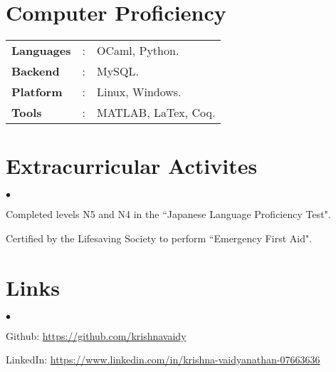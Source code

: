 \documentclass[margin,line]{res}
\newenvironment{list2}{
  \begin{list}{$\bullet$}{%
      \setlength{\itemsep}{0in}
      \setlength{\parsep}{0in} \setlength{\parskip}{0in}
      \setlength{\topsep}{0in} \setlength{\partopsep}{0in} 
      \setlength{\leftmargin}{0.2in}}}{\end{list}}
\begin{document}
\begin{resume}
\section{\sc Computer Proficiency}
\begin{tabular}{l l l}

\textbf{Languages}&: & OCaml, Python.\\
\textbf{Backend}&:	& MySQL.\\
\textbf{Platform}&:  & Linux, Windows.\\
\textbf{Tools}&:     &MATLAB, LaTex, Coq.\\
\end{tabular}

\section{\sc Extracurricular Activites}
\begin{list2}
\item Completed levels N5 and N4 in the ``Japanese Language Proficiency Test".
\item Certified by the Lifesaving Society to perform ``Emergency First Aid".
\end{list2}

\section{\sc Links}
\begin{list2}
\item Github: \url{https://github.com/krishnavaidy}
\item LinkedIn: \url{https://www.linkedin.com/in/krishna-vaidyanathan-07663636}
\end{list2}
\end{resume}
\end{document}
